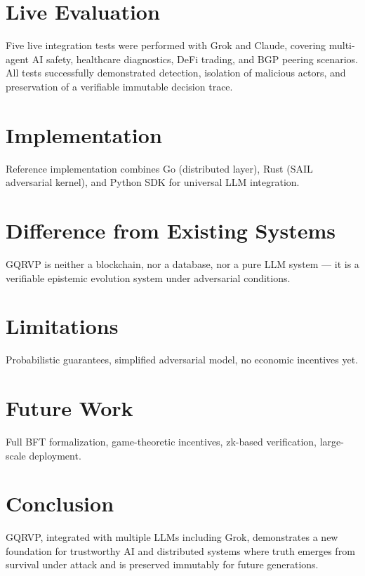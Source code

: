 \documentclass[11pt,a4paper]{article}
\begin{document}
\section{Live Evaluation}
Five live integration tests were performed with Grok and Claude, covering multi-agent AI safety, healthcare diagnostics, DeFi trading, and BGP peering scenarios. All tests successfully demonstrated detection, isolation of malicious actors, and preservation of a verifiable immutable decision trace.

\section{Implementation}
Reference implementation combines Go (distributed layer), Rust (SAIL adversarial kernel), and Python SDK for universal LLM integration.

\section{Difference from Existing Systems}
GQRVP is neither a blockchain, nor a database, nor a pure LLM system — it is a verifiable epistemic evolution system under adversarial conditions.

\section{Limitations}
Probabilistic guarantees, simplified adversarial model, no economic incentives yet.

\section{Future Work}
Full BFT formalization, game-theoretic incentives, zk-based verification, large-scale deployment.

\section{Conclusion}
GQRVP, integrated with multiple LLMs including Grok, demonstrates a new foundation for trustworthy AI and distributed systems where truth emerges from survival under attack and is preserved immutably for future generations.
\end{document}
